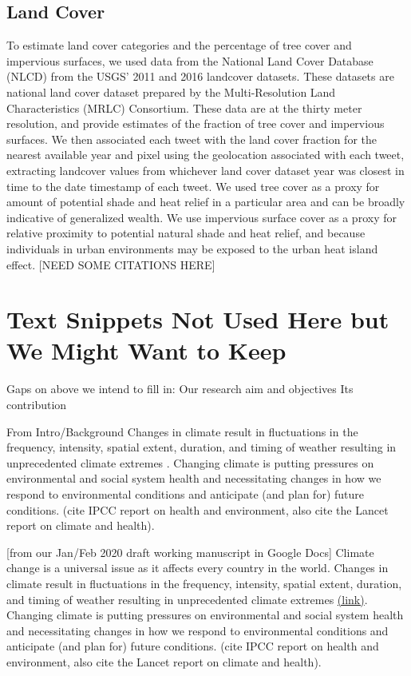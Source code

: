 \documentclass{article}
\begin{document}

\subsection{Land Cover}
To estimate land cover categories and the percentage of tree cover and impervious surfaces, we used data from the National Land Cover Database (NLCD) from the USGS' 2011  \cite{homer_completion_2015} and 2016 \cite{yang_new_2018} landcover datasets. These datasets are national land cover dataset prepared by the Multi-Resolution Land Characteristics (MRLC) Consortium.  These data are at the thirty meter resolution, and provide estimates of the fraction of tree cover and impervious surfaces.  We then associated each tweet with the land cover fraction for the nearest available year and pixel using the geolocation associated with each tweet, extracting landcover values from whichever land cover dataset year was closest in time to the date timestamp of each tweet. We used tree cover as a proxy for amount of potential shade and heat relief in a particular area and can be broadly indicative of generalized wealth. We use impervious surface cover as a proxy for relative proximity to potential natural shade and heat relief, and because individuals in urban environments may be exposed to the urban heat island effect. [NEED SOME CITATIONS HERE] 

\section*{Text Snippets Not Used Here but We Might Want to Keep}
Gaps on above we intend to fill in:
Our research aim and objectives
Its contribution

From Intro/Background
Changes in climate result in fluctuations in the frequency, intensity, spatial extent, duration, and timing of weather resulting in unprecedented climate extremes . Changing climate is putting pressures on environmental and social system health and necessitating changes in how we respond to environmental conditions and anticipate (and plan for) future conditions. (cite IPCC report on health and environment, also cite the Lancet report on climate and health). 

[from our Jan/Feb 2020 draft working manuscript in Google Docs]
Climate change is a universal issue as it affects every country in the world. Changes in climate result in fluctuations in the frequency, intensity, spatial extent, duration, and timing of weather resulting in unprecedented climate extremes \href{https://www.ipcc.ch/site/assets/uploads/2018/03/SREX-Chap3_FINAL-1.pdf}{(link)}. Changing climate is putting pressures on environmental and social system health and necessitating changes in how we respond to environmental conditions and anticipate (and plan for) future conditions. (cite IPCC report on health and environment, also cite the Lancet report on climate and health).
\end{document}
